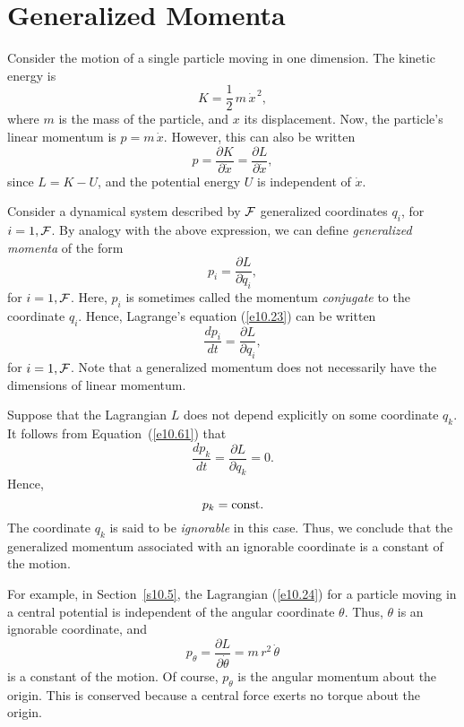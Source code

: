 \section{Generalized Momenta}\label{s10.8}
Consider the motion of a single particle moving in one dimension. The
kinetic energy is
\begin{equation}
K = \frac{1}{2}\,m\,\dot{x}^{\,2},
\end{equation}
where $m$ is the mass of the particle, and $x$ its displacement.
Now, the particle's linear momentum is $p=m\,\dot{x}$. However,
this can also be written 
\begin{equation}
p = \frac{\partial K}{\partial \dot{x}}= \frac{\partial L}{\partial\dot{x}},
\end{equation}
since $L=K-U$, and the potential energy $U$ is independent of $\dot{x}$. 

Consider a dynamical system described by ${\cal F}$ generalized coordinates
$q_i$, for $i=1,{\cal F}$. By analogy with the above expression,  we can
define {\em generalized momenta} of the form
\begin{equation}
p_i = \frac{\partial L}{\partial\dot{q}_i},
\end{equation}
for $i=1,{\cal F}$. Here, $p_i$ is sometimes called the momentum {\em conjugate}\/ to the coordinate $q_i$. Hence, Lagrange's equation (\ref{e10.23}) can be written
\begin{equation}\label{e10.61}
\frac{d p_i}{dt} = \frac{\partial L}{\partial q_i},
\end{equation}
for $i=1,{\cal F}$. Note that a generalized momentum does not necessarily have
the dimensions of linear momentum.

Suppose that the Lagrangian $L$ does not depend explicitly on some coordinate
$q_k$. It follows from Equation~(\ref{e10.61}) that
\begin{equation}
\frac{d p_k}{dt} = \frac{\partial L}{\partial q_k}=0.
\end{equation}
Hence,
\begin{equation}
p_k = {\rm const.}
\end{equation}
The coordinate $q_k$ is said to be {\em ignorable}\/ in this case.
Thus, we conclude that the generalized momentum associated with
an ignorable coordinate is a constant of the motion.

For example, in Section~\ref{s10.5}, the Lagrangian (\ref{e10.24}) for a
particle moving in a central potential is independent of the angular
coordinate $\theta$. Thus, $\theta$ is an ignorable coordinate, 
and
\begin{equation}
p_\theta = \frac{\partial L}{\partial\dot{\theta}} = m\,r^2\,\dot{\theta}
\end{equation}
is a constant of the motion. Of course, $p_\theta$ is the angular momentum
about the origin. This is conserved because a central force exerts no torque
about the origin.

